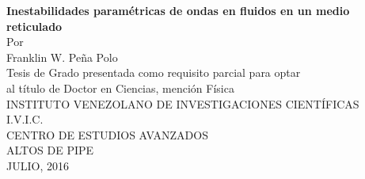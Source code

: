 \thispagestyle{empty}

\begin{center}
\hfill
\vspace{1.5cm}

{\Large\textbf{Inestabilidades paramétricas de ondas en fluidos en un medio reticulado}}\\
\vspace{2.5cm}
Por\\
Franklin W. Pe\~na Polo\\
\vspace{2.5cm}
Tesis de Grado presentada como requisito parcial para optar\\
al título de Doctor en Ciencias, mención Física\\
\vspace{3.5cm}
INSTITUTO VENEZOLANO DE INVESTIGACIONES CIENTÍFICAS\\
I.V.I.C.\\
CENTRO DE ESTUDIOS AVANZADOS\\
ALTOS DE PIPE\\
\vspace{2.5cm}
JULIO, 2016
\end{center}
\newpage